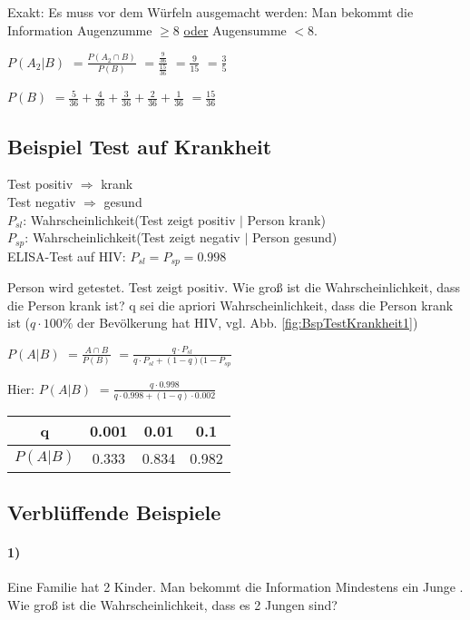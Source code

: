 Exakt: Es muss vor dem Würfeln ausgemacht werden: Man bekommt die Information Augenzumme $\geq 8$ \underline{oder} Augensumme $< 8$. 

$P(A_2|B)$
$=\frac{P(A_2\cap B)}{P(B)}$
$=\frac{\frac{9}{36}}{\frac{15}{36}}$
$=\frac{9}{15}$
$=\frac{3}{5}$

$P(B)$
$=\frac{5}{36} + \frac{4}{36} + \frac{3}{36} + \frac{2}{36} + \frac{1}{36} $
$=\frac{15}{36}$

\subsection{Beispiel Test auf Krankheit}
Test positiv $\Rightarrow$ krank\\
Test negativ $\Rightarrow$ gesund\\
$P_{sl}$: Wahrscheinlichkeit(Test zeigt positiv $\vert$ Person krank)\\
$P_{sp}$: Wahrscheinlichkeit(Test zeigt negativ $\vert$ Person gesund)\\

ELISA-Test auf HIV: $P_{sl} = P_{sp} = 0.998$

Person wird getestet. Test zeigt positiv. Wie groß ist die Wahrscheinlichkeit, dass die Person krank ist? q sei die apriori Wahrscheinlichkeit, dass die Person krank ist ($q \cdot 100 \%$ der Bevölkerung hat HIV, vgl. Abb. \ref{fig:BspTestKrankheit1})

$P(A|B)$
$=\frac{A\cap B}{P(B)}$
$=\frac{q \cdot P_{sl}}{q \cdot P_{sl} + (1-q) (1 - P_{sp}}$

Hier: 
$P(A|B)$
$=\frac{q \cdot 0.998}{q \cdot 0.998 + (1-q) \cdot 0.002}$

\begin{tabular}{|c|c|c|c|}
\hline q & 0.001 & 0.01 & 0.1 \\ 
\hline $P(A|B)$ & 0.333 & 0.834 & 0.982 \\ 
\hline 
\end{tabular} 

\subsection{Verblüffende Beispiele}

\paragraph{1)}
Eine Familie hat 2 Kinder. Man bekommt die Information \glqq Mindestens ein Junge \grqq. Wie groß ist die Wahrscheinlichkeit, dass es 2 Jungen sind?

